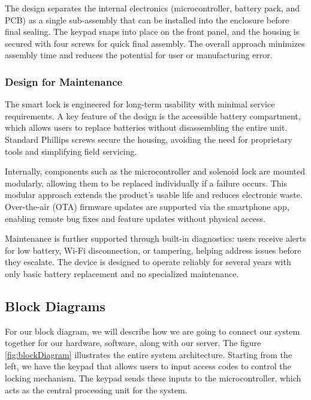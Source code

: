 The design separates the internal electronics (microcontroller, battery pack, and PCB) as a single sub-assembly that can be installed into the enclosure before final sealing. The keypad snaps into place on the front panel, and the housing is secured with four screws for quick final assembly. The overall approach minimizes assembly time and reduces the potential for user or manufacturing error.

\subsubsection*{Design for Maintenance}
The smart lock is engineered for long-term usability with minimal service requirements. A key feature of the design is the accessible battery compartment, which allows users to replace batteries without disassembling the entire unit. Standard Phillips screws secure the housing, avoiding the need for proprietary tools and simplifying field servicing.

Internally, components such as the microcontroller and solenoid lock are mounted modularly, allowing them to be replaced individually if a failure occurs. This modular approach extends the product's usable life and reduces electronic waste. Over-the-air (OTA) firmware updates are supported via the smartphone app, enabling remote bug fixes and feature updates without physical access.

Maintenance is further supported through built-in diagnostics: users receive alerts for low battery, Wi-Fi disconnection, or tampering, helping address issues before they escalate. The device is designed to operate reliably for several years with only basic battery replacement and no specialized maintenance.

\subsection{Block Diagrams}

For our block diagram, we will describe how we are going to connect our system together for our hardware, software, along with our server. The figure \ref{fig:blockDiagram} illustrates the entire system architecture. Starting from the left, we have the keypad that allows users to input access codes to control the locking mechanism. The keypad sends these inputs to the microcontroller, which acts as the central processing unit for the system.


